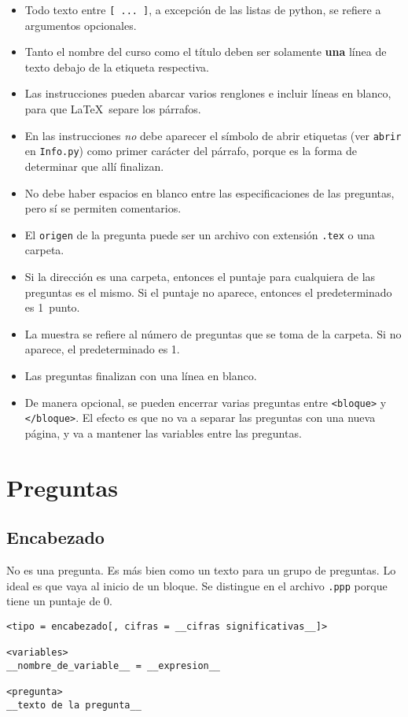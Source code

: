 \documentclass[12pt]{article}
\theoremstyle{definition}
\begin{document}
\begin{itemize}
  \item Todo texto entre \verb|[ ... ]|, a excepci\'on de las listas de python, se refiere a argumentos opcionales.
  \item Tanto el nombre del curso como el título deben ser solamente \textbf{una} línea de texto debajo de la etiqueta respectiva.
  \item Las instrucciones pueden abarcar varios renglones e incluir líneas en blanco, para que \LaTeX\ separe los párrafos. 
  \item En las instrucciones \emph{no} debe aparecer el símbolo de abrir etiquetas (ver \verb|abrir| en \verb|Info.py|) como primer carácter del párrafo, porque es la forma de determinar que allí finalizan.
  \item No debe haber espacios en blanco entre las especificaciones de las preguntas, pero sí se permiten comentarios.
  \item El \verb|origen| de la pregunta puede ser un archivo con extensión \verb|.tex| o una carpeta.
  \item Si la dirección es una carpeta, entonces el puntaje para cualquiera de las preguntas es el mismo. Si el puntaje no aparece, entonces el predeterminado es 1~punto.
  \item La muestra se refiere al n\'umero de preguntas que se toma de la carpeta. Si no aparece, el predeterminado es 1.
  \item Las preguntas finalizan con una línea en blanco.
  \item De manera opcional, se pueden encerrar varias preguntas entre \verb|<bloque>| y \verb|</bloque>|. El efecto es que no va a separar las preguntas con una nueva p\'agina, y va a mantener las variables entre las preguntas.
\end{itemize}

\section{Preguntas}

\subsection{Encabezado}
No es una pregunta. Es m\'as bien como un texto para un grupo de preguntas. Lo ideal es que vaya al inicio de un bloque. Se distingue en el archivo \verb|.ppp| porque tiene un puntaje de 0.

\begin{verbatim}
<tipo = encabezado[, cifras = __cifras significativas__]>

<variables>
__nombre_de_variable__ = __expresion__

<pregunta>
__texto de la pregunta__
\end{verbatim}
\end{document}
